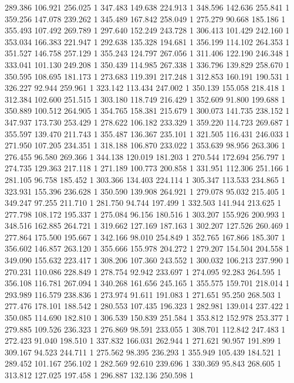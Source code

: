 	289.386	106.921	256.025	1
	347.483	149.638	224.913	1
	348.596	142.636	255.841	1
	359.256	147.078	239.262	1
	345.489	167.842	258.049	1
	275.279	90.668	185.186	1
	355.493	107.492	269.789	1
	297.640	152.249	243.728	1
	306.413	101.429	242.160	1
	353.034	166.383	221.947	1
	292.638	135.328	194.681	1
	356.199	114.102	264.353	1
	351.527	146.758	257.129	1
	355.243	124.797	267.056	1
	311.406	122.190	246.348	1
	333.041	101.130	249.208	1
	350.439	114.985	267.338	1
	336.796	139.829	258.670	1
	350.595	108.695	181.173	1
	273.683	119.391	217.248	1
	312.853	160.191	190.531	1
	326.227	92.944	259.961	1
	323.142	113.434	247.002	1
	350.139	155.058	218.418	1
	312.384	102.600	251.515	1
	303.180	118.749	216.429	1
	352.609	91.800	199.688	1
	350.889	100.512	264.905	1
	354.765	158.381	215.679	1
	300.073	141.735	238.152	1
	347.937	173.730	253.429	1
	278.622	106.182	233.329	1
	359.220	114.723	269.687	1
	355.597	139.470	211.743	1
	355.487	136.367	235.101	1
	321.505	116.431	246.033	1
	271.950	107.205	234.351	1
	318.188	106.870	233.022	1
	353.639	98.956	263.306	1
	276.455	96.580	269.366	1
	344.138	120.019	181.203	1
	270.544	172.694	256.797	1
	274.735	129.363	217.118	1
	271.189	100.773	200.858	1
	331.951	112.306	251.166	1
	281.105	96.758	185.452	1
	303.366	134.403	224.114	1
	305.347	113.533	234.865	1
	323.931	155.396	236.628	1
	350.590	139.908	264.921	1
	279.078	95.032	215.405	1
	349.247	97.255	211.710	1
	281.750	94.744	197.499	1
	332.503	141.944	213.625	1
	277.798	108.172	195.337	1
	275.084	96.156	180.516	1
	303.207	155.926	200.993	1
	348.516	162.885	264.721	1
	319.662	127.169	187.163	1
	302.207	127.526	260.469	1
	277.864	175.500	195.667	1
	342.166	98.010	254.849	1
	352.765	167.866	185.307	1
	356.602	146.857	263.120	1
	355.666	155.978	204.272	1
	279.207	154.504	204.558	1
	349.090	155.632	223.417	1
	308.206	107.360	243.552	1
	300.032	106.213	237.990	1
	270.231	110.086	228.849	1
	278.754	92.942	233.697	1
	274.095	92.283	264.595	1
	356.108	116.781	267.094	1
	340.268	161.656	245.165	1
	355.575	159.701	218.014	1
	293.989	116.579	238.836	1
	273.974	91.611	191.083	1
	271.651	95.250	268.503	1
	277.476	178.101	188.542	1
	280.553	107.435	196.323	1
	282.981	139.014	237.422	1
	350.085	114.690	182.810	1
	306.539	150.839	251.584	1
	353.812	152.978	253.377	1
	279.885	109.526	236.323	1
	276.869	98.591	233.055	1
	308.701	112.842	247.483	1
	272.423	91.040	198.510	1
	337.832	166.031	262.944	1
	271.621	90.957	191.899	1
	309.167	94.523	244.711	1
	275.562	98.395	236.293	1
	355.949	105.439	184.521	1
	289.452	101.167	256.102	1
	282.569	92.610	239.696	1
	330.369	95.843	268.605	1
	313.812	127.025	197.458	1
	296.887	132.136	250.598	1
